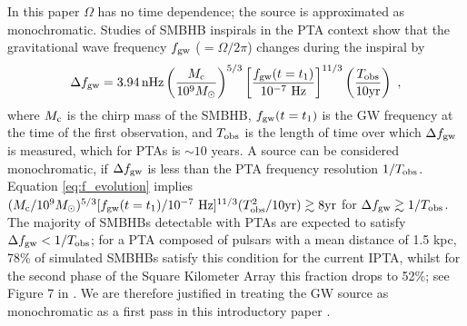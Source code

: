 \documentclass[fleqn,usenatbib,useAMS]{mnras}
\begin{document}
In this paper $\Omega$ has no time dependence; the source is approximated as monochromatic. Studies of SMBHB inspirals in the PTA context show that the gravitational wave frequency $f_{\rm gw}$ ($=\Omega / 2 \pi $) changes during the inspiral by \citep[e.g.][]{Zhu10}
\begin{equation}
	\Delta f_{\rm gw} = 3.94 \, \mathrm{nHz}\left(\frac{M_{\rm c}}{10^9 M_{\odot}}\right)^{5 / 3}\left[\frac{f_{\rm gw}(t=t_1)}{10^{-7} \mathrm{~Hz}}\right]^{11 / 3}\left(\frac{T_{\mathrm{obs}}}{10 \mathrm{yr}}\right) \ ,
	\label{eq:f_evolution}
\end{equation}
where $M_{\rm c}$ is the chirp mass of the SMBHB, $f_{\rm gw}(t=t_1)$ is the GW frequency at the time of the first observation, and $T_{\rm obs}$ is the length of time over which $\Delta f_{\rm gw}$ is measured, which for PTAs is $\sim 10$ years. A source can be considered monochromatic, if $\Delta f_{\rm gw}$ is less than the PTA frequency resolution $1/T_{\rm obs}$. Equation \eqref{eq:f_evolution} implies $(M_{\rm c}/10^9 M_{\odot})^{5/3} [ f_{\rm gw}(t=t_1) / 10^{-7} \mathrm{~Hz}]^{11/3} (T_{\rm obs}^2/10 \mathrm{yr}) \gtrsim 8 \mathrm{yr}$ for $\Delta f_{\rm gw} \gtrsim 1/T_{\rm obs}$. The majority of SMBHBs detectable with PTAs are expected to satisfy $\Delta f_{\rm gw} < 1/T_{\rm obs}$; for a PTA composed of pulsars with a mean distance of 1.5 kpc, 78\% of simulated SMBHBs satisfy this condition for the current IPTA, whilst for the second phase of the Square Kilometer Array this fraction drops to 52\%; see Figure 7 in  \cite{Rosado10.1093/mnras/stv1098}. We are therefore justified in treating the GW source as monochromatic as a first pass in this introductory paper \citep{Sesana10,Sesana2010,Ellis2012ApJ}. \newline 
\end{document}
